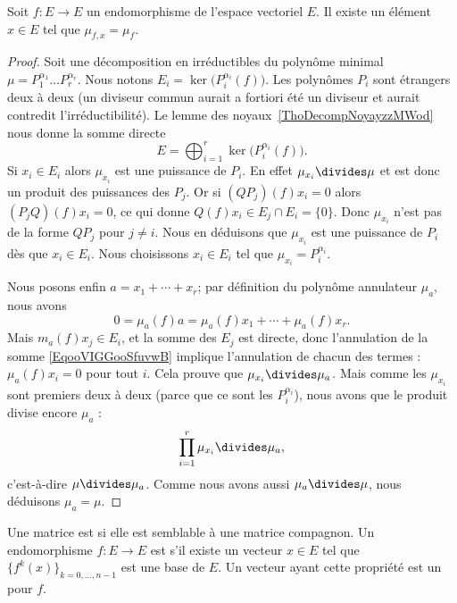 \begin{lemma}\label{LemSYsJJj}
    Soit \( f\colon E\to E\) un endomorphisme de l'espace vectoriel \( E\). Il existe un élément \( x\in E\) tel que \( \mu_{f,x}=\mu_f\).
\end{lemma}

\begin{proof}
    Soit une décomposition en irréductibles du polynôme minimal \( \mu=P_1^{\alpha_1}\ldots P_r^{\alpha_r}\). Nous notons \( E_i=\ker\big( P_i^{\alpha_i}(f) \big)\). Les polynômes \( P_i\) sont étrangers deux à deux (un diviseur commun aurait a fortiori été un diviseur et aurait contredit l'irréductibilité). Le lemme des noyaux~\ref{ThoDecompNoyayzzMWod} nous donne la somme directe
    \begin{equation}
        E=\bigoplus_{i=1}^r\ker\big( P_i^{\alpha_i}(f) \big).
    \end{equation}
    Si \( x_i\in E_i\) alors \( \mu_{x_i}\) est une puissance de \( P_i\). En effet \( \mu_{x_i}\divides \mu\) et est donc un produit des puissances des \( P_j\). Or si \( (QP_j)(f)x_i=0\) alors \( (P_jQ)(f)x_i=0\), ce qui donne \( Q(f)x_i\in E_j\cap E_i=\{ 0 \}\). Donc \( \mu_{x_i}\) n'est pas de la forme \( QP_j\) pour \( j\neq i\). Nous en déduisons que \( \mu_{x_i}\) est une puissance de \( P_i\) dès que \( x_i\in E_i\). Nous choisissons \( x_i\in E_i\) tel que \( \mu_{x_i}=P_i^{\alpha_i}\).

    Nous posons enfin \( a=x_1+\cdots +x_r\); par définition du polynôme annulateur \( \mu_a\), nous avons
    \begin{equation}        \label{EqooVIGGooSfuvwB}
        0=\mu_a(f)a=\mu_a(f)x_1+\cdots +\mu_a(f)x_r.
    \end{equation}
    Mais \( m_a(f)x_j\in E_i\), et la somme des \( E_j\) est directe, donc l'annulation de la somme \eqref{EqooVIGGooSfuvwB} implique l'annulation de chacun des termes : \( \mu_a(f)x_i=0\) pour tout \( i\). Cela prouve que \( \mu_{x_i}\divides \mu_a\). Mais comme les \( \mu_{x_i}\) sont premiers deux à deux (parce que ce sont les \( P_i^{\alpha_i}\)), nous avons que le produit divise encore \( \mu_a\) :
    \begin{equation}
        \prod_{i=1}^r\mu_{x_i}\divides \mu_a,
    \end{equation}
    c'est-à-dire \( \mu\divides \mu_a\). Comme nous avons aussi \( \mu_a\divides \mu\), nous déduisons \( \mu_a=\mu\).
\end{proof}

\begin{definition}      \label{DEFooFEIFooNSGhQE}
    Une matrice est  si elle est semblable à une matrice compagnon. Un endomorphisme \( f\colon E\to E\) est  s'il existe un vecteur \( x\in E\) tel que \( \{ f^k(x) \}_{k=0,\ldots, n-1} \) est une base de \( E\). Un vecteur ayant cette propriété est un  pour \( f\).
\end{definition}

